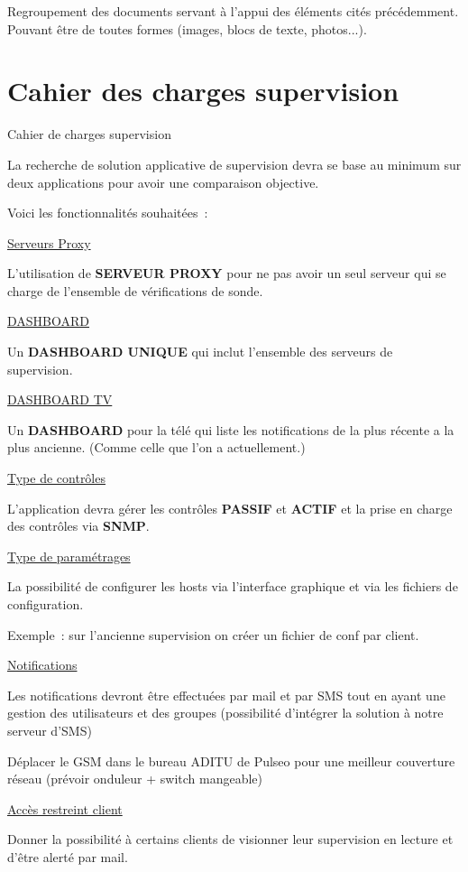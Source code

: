 
Regroupement des documents servant à l'appui des éléments cités précédemment. Pouvant être de toutes formes (images, blocs de texte, photos...).

\section{Cahier des charges supervision}

Cahier de charges supervision

La recherche de solution applicative de supervision devra se base au
minimum sur deux applications pour avoir une comparaison objective.

Voici les fonctionnalités souhaitées~:

\ul{Serveurs Proxy}

L'utilisation de \textbf{SERVEUR PROXY} pour ne pas avoir un seul
serveur qui se charge de l'ensemble de vérifications de sonde.

\ul{DASHBOARD}

Un \textbf{DASHBOARD UNIQUE} qui inclut l'ensemble des serveurs de
supervision.

\ul{DASHBOARD TV}

Un \textbf{DASHBOARD} pour la télé qui liste les notifications de la
plus récente a la plus ancienne. (Comme celle que l'on a actuellement.)

\ul{Type de contrôles}

L'application devra gérer les contrôles \textbf{PASSIF} et
\textbf{ACTIF} et la prise en charge des contrôles via \textbf{SNMP}.

\ul{Type de paramétrages}

La possibilité de configurer les hosts via l'interface graphique et via
les fichiers de configuration.

Exemple~: sur l'ancienne supervision on créer un fichier de conf par
client.

\ul{Notifications}

Les notifications devront être effectuées par mail et par SMS tout en
ayant une gestion des utilisateurs et des groupes (possibilité
d'intégrer la solution à notre serveur d'SMS)

Déplacer le GSM dans le bureau ADITU de Pulseo pour une meilleur
couverture réseau (prévoir onduleur + switch mangeable)

\ul{Accès restreint client}

Donner la possibilité à certains clients de visionner leur supervision
en lecture et d'être alerté par mail.

